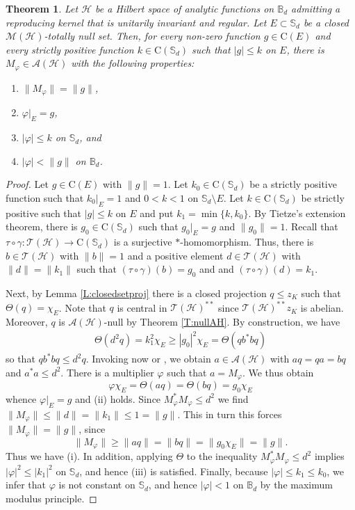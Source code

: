 \documentclass[10pt]{amsart}
\newcommand{\bB}{{\mathbb{B}}}
\newcommand{\bS}{{\mathbb{S}}}
\newcommand{\A}{{\mathcal{A}}}
\renewcommand{\H}{{\mathcal{H}}}
\newcommand{\M}{{\mathcal{M}}}
\newcommand{\T}{{\mathcal{T}}}
\newcommand{\rC}{\mathrm{C}}
\renewcommand{\phi}{\varphi}
\newtheorem{theorem}[lemma]{Theorem}
\theoremstyle{definition}
\begin{document}
\begin{theorem} \label{T:DHbish} Let $\H$ be a Hilbert space of analytic functions on $\bB_d$ admitting  a reproducing kernel that is unitarily invariant and regular.  Let $E\subset \bS_d$ be a closed $\M(\H)$-totally null set. Then, for every non-zero function $g\in \rC(E)$ and every strictly positive function $k\in \rC(\bS_d)$ such that $|g|\leq k$ on $E$, there is $M_\phi\in \A(\H)$ with the following properties:
\begin{enumerate}[{\rm (i)}]
\item $\|M_\phi\|=\|g\|$,
\item $\phi|_E=g$,
\item $|\phi|\leq k$ on $\bS_d$,
and
\item $|\phi|<\|g\|$ on $\bB_d$.
\end{enumerate}
\end{theorem}
\begin{proof}  
Let $g\in \rC(E)$ with $\|g\|=1$. Let $k_0\in \rC(\bS_d)$ be a strictly positive function such that  $k_0|_E=1$ and $0<k<1$ on $\bS_d\setminus E$. Let $k \in \rC(\bS_d)$ be strictly positive such that $|g| \leq k$ on $E$ and put $k_1=\min\{k,k_0\}$.  By Tietze's extension theorem, there is $g_0\in \rC(\bS_d)$ such that $g_0|_E=g$ and $\|g_0\|=1$. Recall that $\tau\circ \gamma:\T(\H)\to \rC(\bS_d)$ is a surjective $*$-homomorphism. Thus,  there is $b\in \T(\H)$ with $\|b\|=1$ and a positive element $d\in \T(\H)$ with  $\|d\|=\|k_1\|$ such that $(\tau\circ \gamma)(b)=g_0$ and and $(\tau\circ \gamma)(d)=k_1$.

Next, by Lemma \ref{L:closedsetproj}
 there is a closed projection $q \leq z_K$ such that $\Theta(q) = \chi_E$.  Note that $q$ is central in $\T(\H)^{**}$ since $\T(\H)^{**} z_K$ is abelian. 
 Moreover, $q$ is $\A(\H)$-null by Theorem \ref{T:nullAH}. By construction, we have
 \begin{align*}
 \Theta(d^2q)=k_1^2 \chi_E\geq |g_0|^2\chi_E=\Theta(q b^* b q)
 \end{align*}
so that $q b^* b q \leq d^2q$.
Invoking now \cite[Theorem 3.4]{blecher2013} or 
\cite[Theorem 2.3 (iii)]{blecher2022}, we obtain $a \in \A(\H)$
with $aq = qa = bq$ and $a^* a \leq d^2$.  There is a multiplier $\phi$ such that $a=M_\phi$. We thus obtain
\[
\phi\chi_E=\Theta(aq)=\Theta(bq)=g_0 \chi_E
\]
whence $\phi|_E=g$ and (ii) holds. Since $M_\phi^*M_\phi\leq d^2$ we find $\|M_\phi\| \leq \|d\|= \|k_1\| \leq 1=\|g\|$.  This  in turn this forces $\|M_\phi\|=\|g\|$, since $$\| M_\phi \| \geq \| aq \| = \| bq \| = \| g_0 \chi_E \| = \| g \|.$$
Thus we have  (i). 
In addition, applying $\Theta$ to  the inequality $M_\phi^*M_\phi\leq d^2$ implies $|\phi|^2 \leq |k_1|^2$ on $\bS_d$, and hence (iii) is satisfied. Finally, because $|\phi|\leq  k_1\leq k_0$, we infer that $\phi$ is not constant on $\bS_d$, and hence $|\phi|<1$ on $\bB_d$ by the maximum modulus principle.
\end{proof} 
\end{document}
